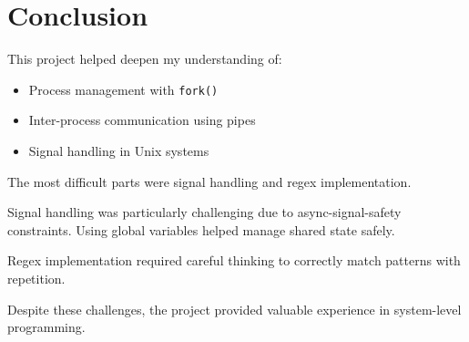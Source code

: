 \documentclass[12pt,a4paper]{article}
\begin{document}
\section{Conclusion}

This project helped deepen my understanding of:

\begin{itemize}
    \item Process management with \texttt{fork()}
    \item Inter-process communication using pipes
    \item Signal handling in Unix systems
\end{itemize}

The most difficult parts were signal handling and regex implementation.

Signal handling was particularly challenging due to async-signal-safety constraints. 
Using global variables helped manage shared state safely.

Regex implementation required careful thinking to correctly match patterns 
with repetition.

Despite these challenges, the project provided valuable experience 
in system-level programming.
\end{document}
